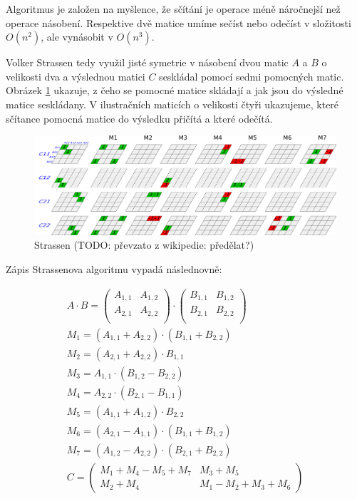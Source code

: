 Algoritmus je založen na myšlence, že sčítání je operace méně náročnejší než operace násobení. Respektive dvě matice umíme sečíst nebo odečíst v složitosti $O(n^2)$, ale vynásobit v $O(n^3)$.

Volker Strassen tedy využil jisté symetrie \cite{StrNat} v násobení dvou matic $A$ a $B$ o velikosti dva a výslednou matici $C$ seskládal pomocí sedmi pomocných matic. Obrázek \ref{fig:StrVis} ukazuje, z čeho se pomocné matice skládají a jak jsou do výsledné matice seskládany. V ilustračních maticích o velikosti čtyři ukazujeme, které sčítance pomocná matice do výsledku přičítá a které odečítá. 

\begin{figure}[H]\centering
	\includegraphics[width=\textwidth]{./images/strassen}
	\caption{Strassen (TODO: převzato z wikipedie: předělat?)}
	\label{fig:StrVis}
\end{figure}

Zápis Strassenova algoritmu vypadá následnovně:	

\begin{align}
A \cdot B = \begin{pmatrix}
 A_{1,1} & A_{1,2} \\
 A_{2,1} & A_{2,2} \\
\end{pmatrix} \cdot \begin{pmatrix}
 B_{1,1} & B_{1,2} \\
 B_{2,1} & B_{2,2} \\
\end{pmatrix} \\
M_{1} = (A_{1,1} + A_{2,2}) \cdot (B_{1,1} + B_{2,2}) \\
M_{2} = (A_{2,1} + A_{2,2}) \cdot B_{1,1} \\
M_{3} = A_{1,1} \cdot (B_{1,2} - B_{2,2}) \\
M_{4} = A_{2,2} \cdot (B_{2,1} - B_{1,1}) \\
M_{5} = (A_{1,1} + A_{1,2}) \cdot B_{2,2} \\
M_{6} = (A_{2,1} - A_{1,1}) \cdot (B_{1,1} + B_{1,2}) \\
M_{7} = (A_{1,2} - A_{2,2}) \cdot (B_{2,1} + B_{2,2}) \\
C = \begin{pmatrix}
 M_{1} + M_{4} - M_{5} + M_{7} & M_{3} + M_{5} \\
 M_{2} + M_{4} & M_{1} - M_{2} + M_{3} + M_{6}
\end{pmatrix}
\end{align}

